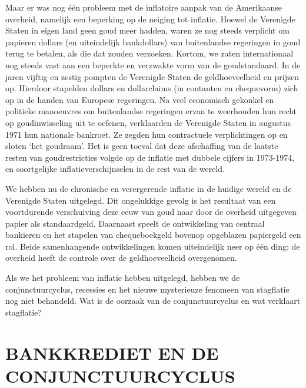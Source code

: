 \documentclass[
  a5paper,
  smalldemyvopaper,10pt,twoside,onecolumn,openright,extrafontsizes,hidelinks]{memoir}
\begin{document}
Maar er was nog één probleem met de inflatoire aanpak van de Amerikaanse
overheid, namelijk een beperking op de neiging tot inflatie. Hoewel de
Verenigde Staten in eigen land geen goud meer hadden, waren ze nog
steeds verplicht om papieren dollars (en uiteindelijk bankdollars) van
buitenlandse regeringen in goud terug te betalen, als die dat zouden
verzoeken. Kortom, we zaten internationaal nog steeds vast aan een
beperkte en verzwakte vorm van de goudstandaard. In de jaren vijftig en
zestig pompten de Verenigde Staten de geldhoeveelheid en prijzen op.
Hierdoor stapelden dollars en dollarclaims (in contanten en chequevorm)
zich op in de handen van Europese regeringen. Na veel economisch
gekonkel en politieke manoeuvres om buitenlandse regeringen ervan te
weerhouden hun recht op goudinwisseling uit te oefenen, verklaarden de
Verenigde Staten in augustus 1971 hun nationale bankroet. Ze zegden hun
contractuele verplichtingen op en sloten `het goudraam'. Het is geen
toeval dat deze afschaffing van de laatste resten van goudrestricties
volgde op de inflatie met dubbele cijfers in 1973-1974, en soortgelijke
inflatieverschijnselen in de rest van de wereld.

We hebben nu de chronische en verergerende inflatie in de huidige wereld
en de Verenigde Staten uitgelegd. Dit ongelukkige gevolg is het
resultaat van een voortdurende verschuiving deze eeuw van goud naar door
de overheid uitgegeven papier als standaardgeld. Daarnaast speelt de
ontwikkeling van centraal bankieren en het stapelen van chequeboekgeld
bovenop opgeblazen papiergeld een rol. Beide samenhangende
ontwikkelingen komen uiteindelijk neer op één ding: de overheid heeft de
controle over de geldhoeveelheid overgenomen.

Als we het probleem van inflatie hebben uitgelegd, hebben we de
conjunctuurcyclus, recessies en het nieuwe mysterieuze fenomeen van
stagflatie nog niet behandeld. Wat is de oorzaak van de
conjunctuurcyclus en wat verklaart stagflatie?

\section{BANKKREDIET EN DE
CONJUNCTUURCYCLUS}\label{bankkrediet-en-de-conjunctuurcyclus}
\end{document}
